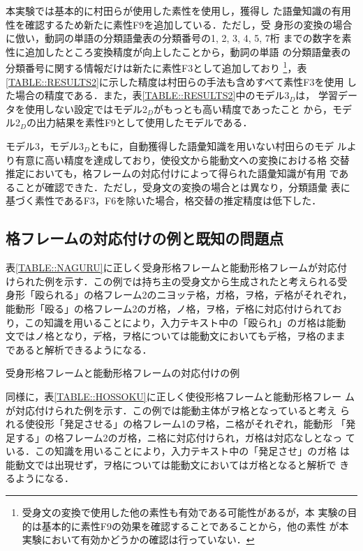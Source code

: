 \documentclass[japanese]{jnlp_1.4}
\begin{document}
  本実験では基本的に村田らが使用した素性\cite{Murata2002}を使用し，獲得し
  た語彙知識の有用性を確認するため新たに素性F9を追加している．ただし，受
  身形の変換の場合に倣い，動詞の単語の分類語彙表の分類番号の1, 2, 3, 4, 5, 7桁
  までの数字を素性に追加したところ変換精度が向上したことから，動詞の単語
  の分類語彙表の分類番号に関する情報だけは新たに素性F3として追加しており
  \footnote{受身文の変換で使用した他の素性も有効である可能性があるが，本
  実験の目的は基本的に素性F9の効果を確認することであることから，他の素性
  が本実験において有効かどうかの確認は行っていない．}，表
  \ref{TABLE::RESULTS2}に示した精度は村田らの手法も含めすべて素性F3を使用
  した場合の精度である．また，表\ref{TABLE::RESULTS2}中のモデル3$_D$は，
  学習データを使用しない設定ではモデル2$_D$がもっとも高い精度であったこと
  から，モデル2$_D$の出力結果を素性F9として使用したモデルである．

  モデル3，モデル3$_D$ともに，自動獲得した語彙知識を用いない村田らのモデ
  ルより有意に高い精度を達成しており，使役文から能動文への変換における格
  交替推定においても，格フレームの対応付けによって得られた語彙知識が有用
  であることが確認できた．ただし，受身文の変換の場合とは異なり，分類語彙
  表に基づく素性であるF3，F6を除いた場合，格交替の推定精度は低下した．


  \subsection{格フレームの対応付けの例と既知の問題点}

  表\ref{TABLE::NAGURU}に正しく受身形格フレームと能動形格フレームが対応付
  けられた例を示す．この例では持ち主の受身文から生成されたと考えられる受
  身形「殴られる」の格フレーム2のニヨッテ格，ガ格，ヲ格，デ格がそれぞれ，
  能動形「殴る」の格フレーム2のガ格，ノ格，ヲ格，デ格に対応付けられてお
  り，この知識を用いることにより，入力テキスト中の「殴られ」のガ格は能動
  文ではノ格となり，デ格，ヲ格については能動文においてもデ格，ヲ格のまま
  であると解析できるようになる．

  \begin{table}[b]
  \caption{受身形格フレームと能動形格フレームの対応付けの例}
\label{TABLE::NAGURU}

  \end{table}

  同様に，表\ref{TABLE::HOSSOKU}に正しく使役形格フレームと能動形格フレー
  ムが対応付けられた例を示す．この例では能動主体がヲ格となっていると考え
  られる使役形「発足させる」の格フレーム1のヲ格，ニ格がそれぞれ，能動形
  「発足する」の格フレーム2のガ格，ニ格に対応付けられ，ガ格は対応なしとなっ
  ている．この知識を用いることにより，入力テキスト中の「発足させ」のガ格
  は能動文では出現せず，ヲ格については能動文においてはガ格となると解析で
  きるようになる．
\end{document}
